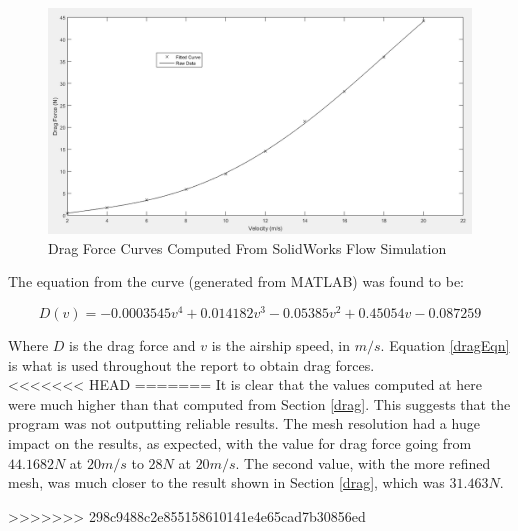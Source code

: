 \documentclass[../main.tex]{subfiles}
\begin{document}
\begin{figure}[H]
	\centering
	\includegraphics[width=\linewidth]{img/drag/curveFit.PNG}
	\caption{Drag Force Curves Computed From SolidWorks Flow Simulation}
	\label{fig:curveFit}
\end{figure}

The equation from the curve (generated from MATLAB) was found to be:

\begin{equation} \label{dragEqn}
	D(v) = -0.0003545v^4 + 0.014182v^3 -0.05385v^2 + 0.45054v -0.087259
\end{equation}

Where $ D $ is the drag force and $ v $ is the airship speed, in $m/s$. Equation \ref{dragEqn} is what is used throughout the report to obtain drag forces.\\

<<<<<<< HEAD
=======
It is clear that the values computed at here were much higher than that computed from Section \ref{drag}. This suggests that the program was not outputting reliable results. The mesh resolution had a huge impact on the results, as expected, with the value for drag force going from $ 44.1682N $ at $ 20m/s $ to $ 28N $ at $ 20m/s $. The second value, with the more refined mesh, was much closer to the result shown in Section \ref{drag}, which was $31.463N$.

>>>>>>> 298c9488c2e855158610141e4e65cad7b30856ed
\end{document}
